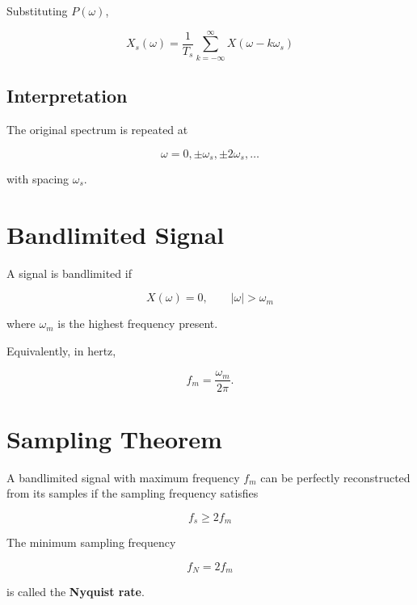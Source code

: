 Substituting \(P(\omega)\),

\[
\boxed{
X_s(\omega)=
\frac{1}{T_s}
\sum_{k=-\infty}^{\infty}
X(\omega-k\omega_s)
}
\]


\subsection{Interpretation}

The original spectrum is repeated at

\[
\omega=0,\pm\omega_s,\pm2\omega_s,\ldots
\]

with spacing \(\omega_s\).


\section{Bandlimited Signal}

A signal is bandlimited if

\[
\boxed{
X(\omega)=0,\qquad |\omega|>\omega_m
}
\]

where \(\omega_m\) is the highest frequency present.

Equivalently, in hertz,

\[
f_m=\frac{\omega_m}{2\pi}.
\]


\section{Sampling Theorem}

\begin{tcolorbox}[title=Nyquist Sampling Theorem,colback=yellow!10]

A bandlimited signal with maximum frequency \(f_m\) can be perfectly reconstructed
from its samples if the sampling frequency satisfies

\[
\boxed{
f_s\ge 2f_m
}
\]

The minimum sampling frequency

\[
\boxed{
f_N=2f_m
}
\]

is called the \textbf{Nyquist rate}.

\end{tcolorbox}


